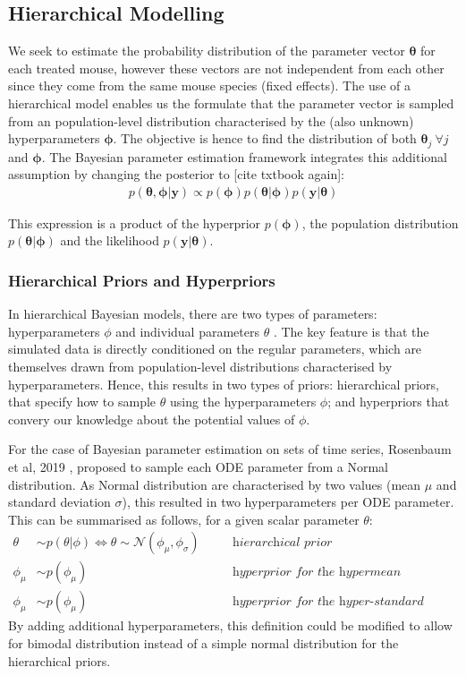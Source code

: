 \documentclass[11pt]{article}
\begin{document}
\subsection{Hierarchical Modelling}
We seek to estimate the probability distribution of the parameter vector $\boldsymbol{\theta}$ for each treated mouse, however these vectors are not independent from each other since they come from the same mouse species (fixed effects). The use of a hierarchical model enables us the formulate that the parameter vector is sampled from an population-level distribution characterised by the (also unknown) hyperparameters $\boldsymbol{\phi}$. The objective is hence to find the distribution of both $\boldsymbol{\theta}_j~\forall j$ and $\boldsymbol{\phi}$. The Bayesian parameter estimation framework integrates this additional assumption by changing the posterior to [cite txtbook again]:
\begin{align*}
    p(\boldsymbol{\theta}, \boldsymbol{\phi} | \boldsymbol{y}) \propto p(\boldsymbol{\phi})p(\boldsymbol{\theta}|\boldsymbol{\phi})p(\boldsymbol{y}|\boldsymbol{\theta})
\end{align*} 

This expression is a product of the hyperprior $p(\boldsymbol{\phi})$, the population distribution $p(\boldsymbol{\theta}|\boldsymbol{\phi})$ and the likelihood $p(\boldsymbol{y}|\boldsymbol{\theta})$.

\subsubsection{Hierarchical Priors and Hyperpriors}
In hierarchical Bayesian models, there are two types of parameters: hyperparameters $\phi$ and individual parameters $\theta$ \cite{tbk_gelman}. The key feature is that the simulated data is directly conditioned on the regular parameters, which are themselves drawn from population-level distributions characterised by hyperparameters. Hence, this results in two types of priors: hierarchical priors, that specify how to sample $\theta$ using the hyperparameters $\phi$; and hyperpriors that convery our knowledge about the potential values of $\phi$.

For the case of Bayesian parameter estimation on sets of time series, Rosenbaum et al, 2019 \cite{rosenbaum}, proposed to sample each ODE parameter from a Normal distribution. As Normal distribution are characterised by two values (mean $\mu$ and standard deviation $\sigma$), this resulted in two hyperparameters per ODE parameter. This can be summarised as follows, for a given scalar parameter $\theta$:
\begin{align*}
    \theta &\sim p(\theta | \phi) \Leftrightarrow \theta \sim \mathcal{N}(\phi_\mu, \phi_\sigma) \quad &&\textit{hierarchical prior} \\ 
    \phi_\mu &\sim p(\phi_\mu) \quad &&\textit{hyperprior for the hypermean} \\ 
    \phi_\mu &\sim p(\phi_\mu) \quad &&\textit{hyperprior for the hyper-standard deviation} 
\end{align*}
By adding additional hyperparameters, this definition could be modified to allow for bimodal distribution instead of a simple normal distribution for the hierarchical priors.
\end{document}

